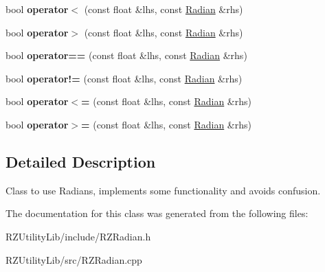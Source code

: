 \begin{DoxyCompactItemize}
\item 
\hypertarget{classrcz_engine_1_1_radian_a51c243182c2f0a109539f594e5e178b6}{}bool {\bfseries operator$<$} (const float \&lhs, const \hyperlink{classrcz_engine_1_1_radian}{Radian} \&rhs)\label{classrcz_engine_1_1_radian_a51c243182c2f0a109539f594e5e178b6}

\item 
\hypertarget{classrcz_engine_1_1_radian_a814da6f3b1e82dd86181d174774b3bad}{}bool {\bfseries operator$>$} (const float \&lhs, const \hyperlink{classrcz_engine_1_1_radian}{Radian} \&rhs)\label{classrcz_engine_1_1_radian_a814da6f3b1e82dd86181d174774b3bad}

\item 
\hypertarget{classrcz_engine_1_1_radian_abb941e67aea9c427fdb6bd736fbf1cc3}{}bool {\bfseries operator==} (const float \&lhs, const \hyperlink{classrcz_engine_1_1_radian}{Radian} \&rhs)\label{classrcz_engine_1_1_radian_abb941e67aea9c427fdb6bd736fbf1cc3}

\item 
\hypertarget{classrcz_engine_1_1_radian_a83c85bb5ff5833e6bb629593d7869a44}{}bool {\bfseries operator!=} (const float \&lhs, const \hyperlink{classrcz_engine_1_1_radian}{Radian} \&rhs)\label{classrcz_engine_1_1_radian_a83c85bb5ff5833e6bb629593d7869a44}

\item 
\hypertarget{classrcz_engine_1_1_radian_a5ae8e2a01a338d6b0fdb95b022362398}{}bool {\bfseries operator$<$=} (const float \&lhs, const \hyperlink{classrcz_engine_1_1_radian}{Radian} \&rhs)\label{classrcz_engine_1_1_radian_a5ae8e2a01a338d6b0fdb95b022362398}

\item 
\hypertarget{classrcz_engine_1_1_radian_a3472a2b0aa1c10697a50cfc3db5c820d}{}bool {\bfseries operator$>$=} (const float \&lhs, const \hyperlink{classrcz_engine_1_1_radian}{Radian} \&rhs)\label{classrcz_engine_1_1_radian_a3472a2b0aa1c10697a50cfc3db5c820d}

\end{DoxyCompactItemize}


\subsection{Detailed Description}
Class to use Radians, implements some functionality and avoids confusion. 

The documentation for this class was generated from the following files\+:\begin{DoxyCompactItemize}
\item 
R\+Z\+Utility\+Lib/include/R\+Z\+Radian.\+h\item 
R\+Z\+Utility\+Lib/src/R\+Z\+Radian.\+cpp\end{DoxyCompactItemize}
